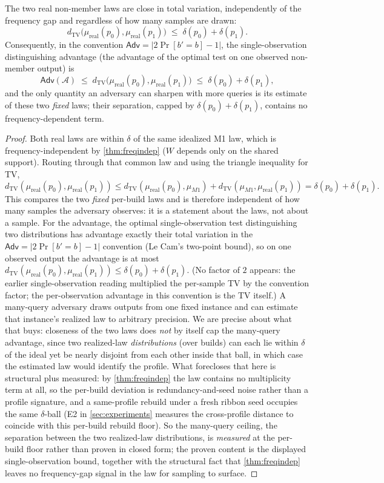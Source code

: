 \documentclass[acmsmall,review]{acmart}
\newcommand{\TV}{d_{\mathrm{TV}}}
\newcommand{\W}{W}                          %
\newcommand{\Adv}{\mathsf{Adv}}             %
\newcommand{\lawreal}{\mu_{\mathrm{real}}}  %
\newcommand{\lawM}{\mu_{M1}}                %
\begin{document}
\begin{theorem}
\label{thm:freqdist-real}
The two real non-member laws are close in total variation, independently of the frequency gap and
regardless of how many samples are drawn:
\[
  \TV\big(\lawreal(p_0), \lawreal(p_1)\big) \;\le\; \delta(p_0) + \delta(p_1).
\]
Consequently, in the convention $\Adv = |2\Pr[b'=b]-1|$, the single-observation
distinguishing advantage (the advantage of the optimal test on one observed non-member
output) is
\[
  \Adv(\mathcal{A}) \;\le\; \TV\big(\lawreal(p_0), \lawreal(p_1)\big)
  \;\le\; \delta(p_0) + \delta(p_1),
\]
and the only quantity an adversary can sharpen with more queries is its estimate of these
two \emph{fixed} laws; their separation, capped by $\delta(p_0)+\delta(p_1)$, contains no
frequency-dependent term.
\end{theorem}

\begin{proof}
Both real laws are within $\delta$ of the same idealized M1 law, which is
frequency-independent by \cref{thm:freqindep} ($\W$ depends only on the shared support).
Routing through that common law and using the triangle inequality for TV,
\[
  \TV(\lawreal(p_0), \lawreal(p_1))
  \le \TV(\lawreal(p_0), \lawM) + \TV(\lawM, \lawreal(p_1))
  = \delta(p_0) + \delta(p_1).
\]
This compares the two \emph{fixed} per-build laws and is therefore independent of how many
samples the adversary observes: it is a statement about the laws, not about a sample. For
the advantage, the optimal single-observation test distinguishing two distributions has
advantage exactly their total variation in the $\Adv = |2\Pr[b'=b]-1|$ convention (Le Cam's
two-point bound), so on one observed output the advantage is at most
$\TV(\lawreal(p_0), \lawreal(p_1)) \le \delta(p_0) + \delta(p_1)$. (No factor of $2$
appears: the earlier single-observation reading multiplied the per-sample TV by the
convention factor; the per-observation advantage in this convention is the TV itself.)
A many-query adversary draws outputs from one fixed instance and can estimate that
instance's realized law to arbitrary precision. We are precise about what that buys:
closeness of the two laws does \emph{not} by itself cap the many-query advantage, since two
realized-law \emph{distributions} (over builds) can each lie within $\delta$ of the ideal yet
be nearly disjoint from each other inside that ball, in which case the estimated law would
identify the profile. What forecloses that here is structural plus measured: by
\cref{thm:freqindep} the law contains no multiplicity term at all, so the per-build deviation
is redundancy-and-seed noise rather than a profile signature, and a same-profile rebuild under
a fresh ribbon seed occupies the same $\delta$-ball (E2 in \cref{sec:experiments} measures the
cross-profile distance to coincide with this per-build rebuild floor). So the many-query
ceiling, the separation between the two realized-law distributions, is \emph{measured} at the
per-build floor rather than proven in closed form; the proven content is the displayed
single-observation bound, together with the structural fact that \cref{thm:freqindep} leaves
no frequency-gap signal in the law for sampling to surface.
\end{proof}
\end{document}
